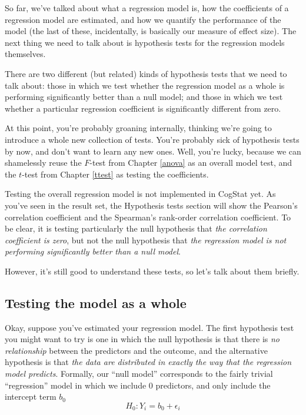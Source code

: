 \documentclass[
  11pt,
  a4paper,
  twoside,symmetric,openright]{book}
\theoremstyle{break}
\theoremstyle{break}
\begin{document}
So far, we've talked about what a regression model is, how the coefficients of a regression model are estimated, and how we quantify the performance of the model (the last of these, incidentally, is basically our measure of effect size). The next thing we need to talk about is hypothesis tests for the regression models themselves.

There are two different (but related) kinds of hypothesis tests that we need to talk about: those in which we test whether the regression model as a whole is performing significantly better than a null model; and those in which we test whether a particular regression coefficient is significantly different from zero.

At this point, you're probably groaning internally, thinking we're going to introduce a whole new collection of tests. You're probably sick of hypothesis tests by now, and don't want to learn any new ones. Well, you're lucky, because we can shamelessly reuse the \(F\)-test from Chapter \ref{anova} as an overall model test, and the \(t\)-test from Chapter \ref{ttest} as testing the coefficients.

Testing the overall regression model is not implemented in CogStat yet. As you've seen in the result set, the Hypothesis tests section will show the Pearson's correlation coefficient and the Spearman's rank-order correlation coefficient. To be clear, it is testing particularly the null hypothesis that \emph{the correlation coefficient is zero}, but not the null hypothesis that \emph{the regression model is not performing significantly better than a null model}.

However, it's still good to understand these tests, so let's talk about them briefly.

\subsection{Testing the model as a whole}\label{testing-the-model-as-a-whole}

Okay, suppose you've estimated your regression model. The first hypothesis test you might want to try is one in which the null hypothesis is that there is \emph{no relationship} between the predictors and the outcome, and the alternative hypothesis is that \emph{the data are distributed in exactly the way that the regression model predicts}. Formally, our ``null model'' corresponds to the fairly trivial ``regression'' model in which we include 0 predictors, and only include the intercept term \(b_0\)
\[
H_0: Y_i = b_0 + \epsilon_i
\]
\end{document}
